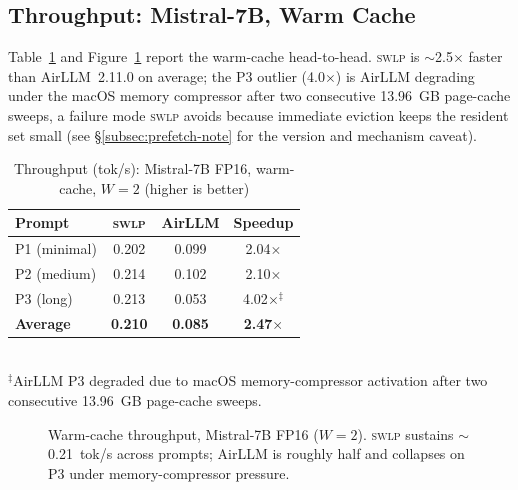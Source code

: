 \documentclass[10pt,a4paper]{article}
\newcommand{\swlp}{\textsc{swlp}}
\begin{document}
\subsection{Throughput: Mistral-7B, Warm Cache}
\label{subsec:throughput}

Table~\ref{tab:throughput} and Figure~\ref{fig:bars} report the warm-cache
head-to-head. \swlp{} is $\sim$2.5$\times$ faster than AirLLM~2.11.0 on average; the P3
outlier (4.0$\times$) is AirLLM degrading under the macOS memory compressor after
two consecutive 13.96~GB page-cache sweeps, a failure mode \swlp{} avoids because
immediate eviction keeps the resident set small (see \S\ref{subsec:prefetch-note}
for the version and mechanism caveat).

\begin{table}[htbp]
\centering
\caption{Throughput (tok/s): Mistral-7B FP16, warm-cache, $W=2$ (higher is better)}
\label{tab:throughput}
\begin{tabular}{@{}lccc@{}}
\toprule
\textbf{Prompt} & \textbf{\swlp{}} & \textbf{AirLLM} & \textbf{Speedup} \\
\midrule
P1 (minimal) & 0.202 & 0.099 & 2.04$\times$ \\
P2 (medium) & 0.214 & 0.102 & 2.10$\times$ \\
P3 (long) & 0.213 & 0.053 & 4.02$\times$$^\ddagger$ \\
\midrule
\textbf{Average} & \textbf{0.210} & \textbf{0.085} & \textbf{2.47$\times$} \\
\bottomrule
\end{tabular}
\\[0.3em]
{\small $^\ddagger$AirLLM P3 degraded due to macOS memory-compressor activation
after two consecutive 13.96~GB page-cache sweeps.}
\end{table}

\begin{figure}[htbp]
\centering
{}
\caption{Warm-cache throughput, Mistral-7B FP16 ($W=2$). \swlp{} sustains
$\sim$0.21~tok/s across prompts; AirLLM is roughly half and collapses on P3 under
memory-compressor pressure.}
\label{fig:bars}
\end{figure}
\end{document}
